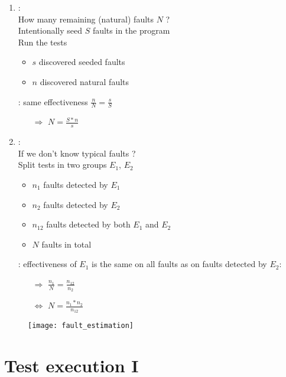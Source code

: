 \begin{enumerate}
    \item{} :\\
    How many remaining (natural) faults $N$ ?\\
    Intentionally seed $S$ faults in the program\\
    Run the tests
    \begin{itemize}
        \item $s$ discovered seeded faults
        \item $n$ discovered natural faults
    \end{itemize}
    : same effectiveness $\frac{n}{N} = \frac{s}{S}$
    \begin{itemize}
        \item [$\Rightarrow$]$N = \frac{S * n}{s}$
    \end{itemize}

    \item {} :\\
    If we don’t know typical faults ?\\
    Split tests in two groups $E_1$, $E_2$
    \begin{itemize}
        \item $n_1$ faults detected by $E_1$
        \item $n_2$ faults detected by $E_2$
        \item $n_{12}$ faults detected by both $E_1$ and $E_2$
        \item $N$ faults in total
    \end{itemize}

     : effectiveness of $E_1$ is the same on all faults as on faults detected by $E_2$:
    \begin{itemize}
        \item [$\Rightarrow$]$\frac{n_1}{N} = \frac{n_{12}}{n_2}$
        \item [$\Leftrightarrow$]$N = \frac{n_1 * n_2}{n_{12}}$
    \end{itemize}
\end{enumerate}

\begin{figure}[H]
    \centering
    \texttt{[image: fault\_estimation]}
\end{figure}

\chapter{Test execution I}

